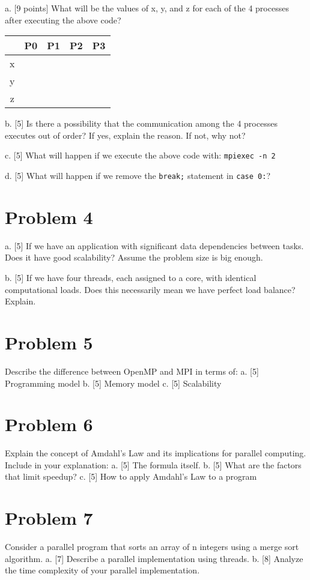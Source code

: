 \documentclass{article}
\begin{document}
a. [9 points] What will be the values of x, y, and z for each of the 4 processes after executing the above code?

\begin{tabular}{|c|c|c|c|c|}
\hline
 & P0 & P1 & P2 & P3 \\
\hline
x &  &  &  &  \\
y &  &  &  &  \\
z &  &  &  &  \\
\hline
\end{tabular}

b. [5] Is there a possibility that the communication among the 4 processes executes out of order? If yes, explain the reason. If not, why not?

c. [5] What will happen if we execute the above code with: \texttt{mpiexec -n 2}

d. [5] What will happen if we remove the \texttt{break;} statement in \texttt{case 0:}?


\section*{Problem 4}
a. [5] If we have an application with significant data dependencies between tasks. Does it have good scalability? Assume the problem size is big enough.

b. [5] If we have four threads, each assigned to a core, with identical computational loads. Does this necessarily mean we have perfect load balance? Explain.


\section*{Problem 5}
Describe the difference between OpenMP and MPI in terms of:
a. [5] Programming model
b. [5] Memory model
c. [5] Scalability


\section*{Problem 6}
Explain the concept of Amdahl's Law and its implications for parallel computing.  Include in your explanation:
a. [5] The formula itself.
b. [5] What are the factors that limit speedup?
c. [5] How to apply Amdahl's Law to a program


\section*{Problem 7}
Consider a parallel program that sorts an array of n integers using a merge sort algorithm.
a. [7] Describe a parallel implementation using threads.
b. [8] Analyze the time complexity of your parallel implementation.
\end{document}
